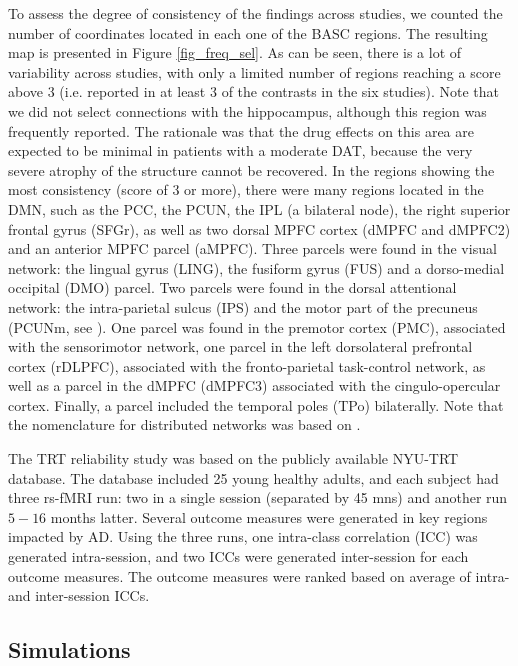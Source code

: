 To assess the degree of consistency of the findings across studies, we counted the number of coordinates located in each one of the BASC regions. The resulting map is presented in Figure \ref{fig_freq_sel}. As can be seen, there is a lot of variability across studies, with only a limited number of regions reaching a score above 3 (i.e. reported in at least 3 of the contrasts in the six studies). Note that we did not select connections with the hippocampus, although this region was frequently reported. The rationale was that the drug effects on this area are expected to be minimal in patients with a moderate DAT, because the very severe atrophy of the structure cannot be recovered. In the regions showing the most consistency (score of 3 or more), there were many regions located in the DMN, such as the PCC, the PCUN, the IPL (a bilateral node), the right superior frontal gyrus (SFGr), as well as two dorsal MPFC cortex (dMPFC and dMPFC2) and an anterior MPFC parcel (aMPFC). Three parcels were found in the 
visual network: the lingual gyrus (LING), the fusiform gyrus (FUS) and a dorso-medial occipital (DMO) parcel. Two parcels were found in the dorsal attentional network: the intra-parietal sulcus (IPS) and the motor part of the precuneus (PCUNm, see \cite{Margulies2009}). One parcel was found in the premotor cortex (PMC), associated with the sensorimotor network, one parcel in the left dorsolateral prefrontal cortex (rDLPFC), associated with the fronto-parietal task-control network, as well as a parcel in the dMPFC (dMPFC3) associated with the cingulo-opercular cortex. Finally, a parcel included the temporal poles (TPo) bilaterally. Note that the nomenclature for distributed networks was based on \citep{Power2011}. 

The TRT reliability study was based on the publicly available NYU-TRT database. The database included 25 young healthy adults, and each subject had three rs-fMRI run: two in a single session (separated by 45 mns) and another run $5-16$ months latter. Several outcome measures were generated in key regions impacted by AD. Using the three runs, one intra-class correlation (ICC) was generated intra-session, and two ICCs were generated inter-session for each outcome measures. The outcome measures were ranked based on average of intra- and inter-session ICCs. 

\subsection{Simulations}
